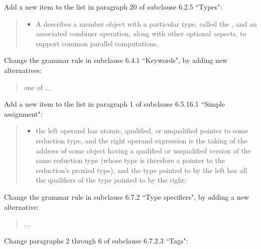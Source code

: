 Add a new item
to the list in paragraph 20 of subclause 6.2.5 ``Types":

\begin{quote}
\begin{itemize}
\item
A
describes a member object with a particular type,
called the
,
and an associated combiner operation,
along with other optional aspects,
to support common parallel computations.
\end{itemize}
\end{quote}

Change the grammar rule in subclause 6.4.1 ``Keywords",
by adding new alternatives:

\begin{quote}
\begin{bnf}
\textnormal{one of}\br
...\br
{}\br
{}\br
{}\br
{}\br
{}\br
{}
\end{bnf}
\end{quote}

Add a new item to the list
in paragraph 1 of subclause 6.5.16.1 ``Simple assignment":

\begin{quote}
\begin{itemize}
\item
the left operand has atomic, qualified, or unqualified
pointer to some reduction type,
and the right operand expression
is the taking of the address
of some object having a qualified or unqualified version
of the same reduction type
(whose type is therefore a pointer to the reduction's proxied type),
and the type pointed to by the left
has all the qualifiers of the type pointed to by the right;
\end{itemize}
\end{quote}

Change the grammar rule in subclause 6.7.2 ``Type specifiers",
by adding a new alternative:

\begin{quote}
\begin{bnf}
\br
...
\br
{}
\end{bnf}
\end{quote}

Change paragraphs 2 through 6 of subclause 6.7.2.3 ``Tags":

